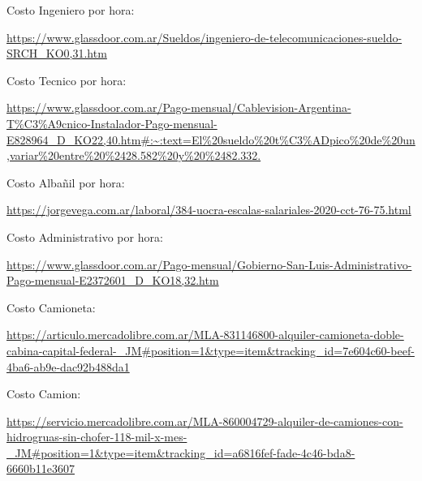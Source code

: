 \begin{thebibliography}{99}


 Costo Ingeniero por hora: \begin{tiny}
\url{https://www.glassdoor.com.ar/Sueldos/ingeniero-de-telecomunicaciones-sueldo-SRCH_KO0,31.htm}
\end{tiny}



 Costo Tecnico por hora: \begin{tiny}
\url{https://www.glassdoor.com.ar/Pago-mensual/Cablevision-Argentina-T\%C3\%A9cnico-Instalador-Pago-mensual-E828964_D_KO22,40.htm#:~:text=El\%20sueldo\%20t\%C3\%ADpico\%20de\%20un,variar\%20entre\%20\%2428.582\%20y\%20\%2482.332.}
\end{tiny}




 Costo Albañil por hora: \begin{tiny}
\url{https://jorgevega.com.ar/laboral/384-uocra-escalas-salariales-2020-cct-76-75.html}
\end{tiny}




 Costo Administrativo por hora: \begin{tiny}
\url{https://www.glassdoor.com.ar/Pago-mensual/Gobierno-San-Luis-Administrativo-Pago-mensual-E2372601_D_KO18,32.htm}
\end{tiny}




 Costo Camioneta: \begin{tiny}
\url{https://articulo.mercadolibre.com.ar/MLA-831146800-alquiler-camioneta-doble-cabina-capital-federal-_JM#position=1&type=item&tracking_id=7e604c60-beef-4ba6-ab9e-dac92b488da1}
\end{tiny}



 Costo Camion: \begin{tiny}
\url{https://servicio.mercadolibre.com.ar/MLA-860004729-alquiler-de-camiones-con-hidrogruas-sin-chofer-118-mil-x-mes-_JM#position=1&type=item&tracking_id=a6816fef-fade-4c46-bda8-6660b11e3607}
\end{tiny}




\end{thebibliography}


\newpage